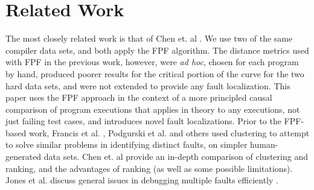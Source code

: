 \section{Related Work}
\label{sec:related}

 
The most closely related work is that of Chen et. al \cite{PLDI13}.  We use two of the same compiler data sets, and both apply the FPF \cite{Gonzalez} algorithm.  The distance metrics used with FPF in the previous work, however, were \emph{ad hoc}, chosen for each program by hand, produced poorer results for the critical portion of the curve for the two hard data sets, and were not extended to provide any fault localization.  This paper uses the FPF approach in the context of a more principled causal comparison of program executions that applies in theory to any executions, not just failing test cases, and introduces novel fault localizations.  Prior to the FPF-based work, Francis et al. \cite{Podgurski04}, Podgurski et al. \cite{Podgurski03} and others \cite{Liu06,Liblit05} used clustering to attempt to solve similar problems in identifying distinct faults, on simpler human-generated data sets.  Chen et. al \cite{PLDI13} provide an in-depth comparison of clustering and ranking, and the advantages of ranking (as well as some possible limitations).  Jones et al. discuss general issues in debugging multiple faults efficiently \cite{Jones07}.

